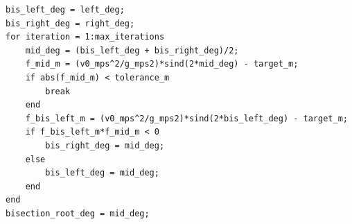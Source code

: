 \documentclass[border=12pt]{standalone}
\begin{document}
\begin{lstlisting}[style=matlab]
bis_left_deg = left_deg;
bis_right_deg = right_deg;
for iteration = 1:max_iterations
    mid_deg = (bis_left_deg + bis_right_deg)/2;
    f_mid_m = (v0_mps^2/g_mps2)*sind(2*mid_deg) - target_m;
    if abs(f_mid_m) < tolerance_m
        break
    end
    f_bis_left_m = (v0_mps^2/g_mps2)*sind(2*bis_left_deg) - target_m;
    if f_bis_left_m*f_mid_m < 0
        bis_right_deg = mid_deg;
    else
        bis_left_deg = mid_deg;
    end
end
bisection_root_deg = mid_deg;
\end{lstlisting}
\end{document}
